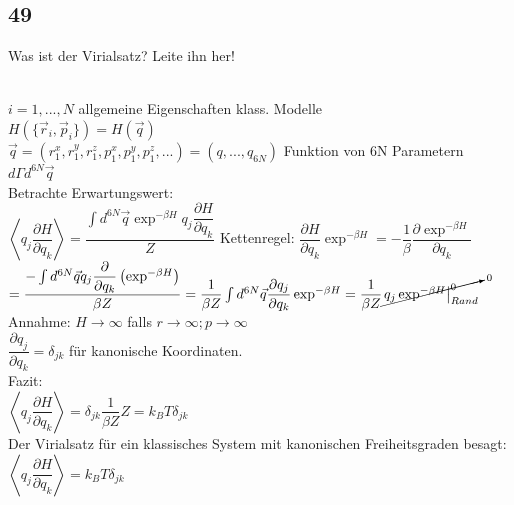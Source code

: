 \documentclass[12pt,a4paper]{report}
\newenvironment{myfrag}{\begin{it}}{\end{it}\vspace{3mm}\par}
\numberwithin{equation}{section}
\begin{document}
\subsection{49}
\begin{myfrag}
Was ist der Virialsatz? Leite ihn her!
\end{myfrag} \quad \\
$i= 1,...,N $ \qquad allgemeine Eigenschaften klass. Modelle \\[1.5ex]
$H(\{\vec{r}_i,\vec{p}_i\})=H(\vec{q})$\\[1ex]
$\vec{q}=(r_1^x,r_1^y,r_1^z, p_1^x,p_1^y,p_1^z,...)=(q,...,q_{6N})$ Funktion von 6N Parametern $d\Gamma d^{6N}\vec{q}$ \\[1.5ex]
Betrachte Erwartungswert: \\[1.5ex]
$\left\langle q_j \dfrac{\partial H}{\partial q_k} \right\rangle = \dfrac{\int d^{6N} \vec{q} \exp ^{-\beta H} q_j \dfrac{\partial H}{\partial q_k}}{Z}$ \qquad Kettenregel: $\dfrac{\partial H}{\partial q_k} \exp ^{-\beta H} = -\dfrac{1}{\beta } \dfrac{\partial \exp ^{ -\beta H}}{\partial q_k}$ \\[1ex]
$= \dfrac{-\int d^{6N} \vec{q} q_j \dfrac{\partial}{\partial q_k}\left( \exp ^{-\beta H} \right)}{\beta Z} = \dfrac{1}{\beta Z} \int d^{6N} \vec{q} \dfrac{\partial q_j}{\partial q_k} \exp ^{-\beta H} = \dfrac{1}{\beta Z} \cancelto{0}{\left. q_j \exp^{-\beta H}\right| _{Rand} ^0} $ \\[1.5ex]
Annahme: $ H \rightarrow \infty $ falls $r\rightarrow \infty; p\rightarrow \infty$ \\[1ex]
$\dfrac{\partial q_j}{\partial q_k} = \delta_{jk}$ für kanonische Koordinaten. \\[1.5ex]
Fazit: \\[1.5ex]
$\left\langle q_j \dfrac{\partial H}{\partial q_k}\right\rangle = \delta_{jk} \dfrac{1}{\beta Z}Z = k_BT\delta_{jk}$ \\[1.5ex]
Der Virialsatz für ein klassisches System mit kanonischen Freiheitsgraden besagt:
\\[1.5ex]
$\left\langle q_j \dfrac{\partial H}{\partial q_k}\right\rangle = k_BT\delta_{jk}$
\end{document}
